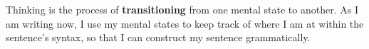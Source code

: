 \documentclass[orivec]{llncs}
\newcommand{\emp}[1]{\textbf{#1}}
\begin{document}
Thinking is the process of \emp{transitioning} from one mental state to another.  As I am writing now, I use my mental states to keep track of where I am at within the sentence's syntax, so that I can construct my sentence grammatically.

\end{document}
